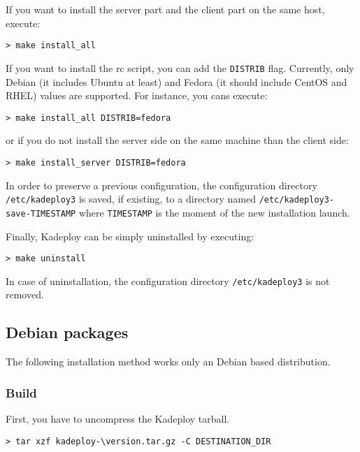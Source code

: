\documentclass[a4wide,10pt,oneside]{book}
\newcommand{\version}{3.1.7}
\begin{document}
\noindent If you want to install the server part and the client part on the same host, execute:
\begin{small}
\begin{verbatim}
> make install_all
\end{verbatim}
\end{small}

\noindent If you want to install the rc script, you can add the \texttt{DISTRIB} flag. Currently, only Debian (it includes Ubuntu at least) and Fedora (it should include CentOS and RHEL) values are supported. For instance, you cans execute:
\begin{small}
\begin{verbatim}
> make install_all DISTRIB=fedora
\end{verbatim}
\end{small}
or if you do not install the server side on the same machine than the client side:
\begin{small}
\begin{verbatim}
> make install_server DISTRIB=fedora
\end{verbatim}
\end{small}

\noindent In order to preserve a previous configuration, the configuration directory \texttt{/etc/kadeploy3} is saved, if existing, to a directory named \texttt{/etc/kadeploy3-save-TIMESTAMP} where \texttt{TIMESTAMP} is the moment of the new installation launch.

\noindent Finally, Kadeploy can be simply uninstalled by executing:
\begin{small}
\begin{verbatim}
> make uninstall
\end{verbatim}
\end{small}

\noindent In case of uninstallation, the configuration directory \texttt{/etc/kadeploy3} is not removed.

\subsection{Debian packages}
The following installation method works only an Debian based distribution.
\subsubsection{Build}
\noindent First, you have to uncompress the Kadeploy tarball. 
\begin{small}
\begin{Verbatim}[commandchars=\\\{\}]
> tar xzf kadeploy-\version.tar.gz -C DESTINATION_DIR
\end{Verbatim}
\end{small}
\end{document}
